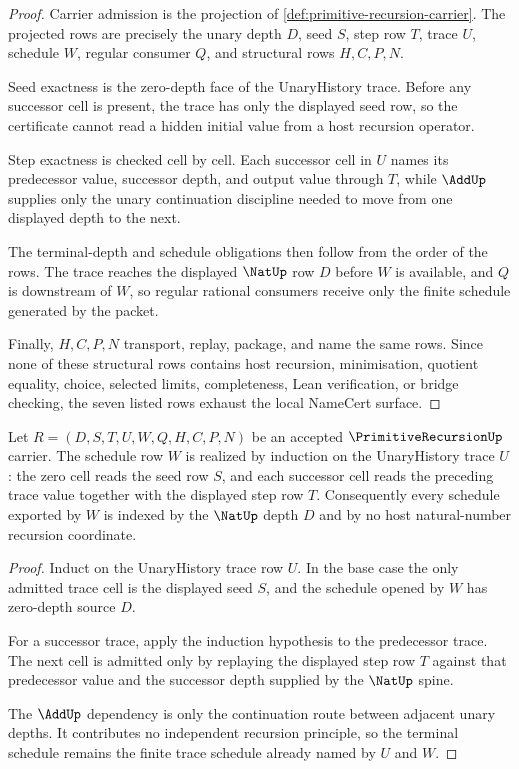 \begin{proof}
Carrier admission is the projection of \autoref{def:primitive-recursion-carrier}. The projected rows are precisely the unary depth $D$, seed $S$, step row $T$, trace $U$, schedule $W$, regular consumer $Q$, and structural rows $H,C,P,N$.

Seed exactness is the zero-depth face of the UnaryHistory trace. Before any successor cell is present, the trace has only the displayed seed row, so the certificate cannot read a hidden initial value from a host recursion operator.

Step exactness is checked cell by cell. Each successor cell in $U$ names its predecessor value, successor depth, and output value through $T$, while $\AddUp$ supplies only the unary continuation discipline needed to move from one displayed depth to the next.

The terminal-depth and schedule obligations then follow from the order of the rows. The trace reaches the displayed $\NatUp$ row $D$ before $W$ is available, and $Q$ is downstream of $W$, so regular rational consumers receive only the finite schedule generated by the packet.

Finally, $H,C,P,N$ transport, replay, package, and name the same rows. Since none of these structural rows contains host recursion, minimisation, quotient equality, choice, selected limits, completeness, Lean verification, or bridge checking, the seven listed rows exhaust the local NameCert surface.
\end{proof}

\begin{theorem}
\label{thm:primitive-recursion-unary-schedule-realization}
Let $R=(D,S,T,U,W,Q,H,C,P,N)$ be an accepted $\PrimitiveRecursionUp$ carrier. The schedule row $W$ is realized by induction on the UnaryHistory trace $U$: the zero cell reads the seed row $S$, and each successor cell reads the preceding trace value together with the displayed step row $T$. Consequently every schedule exported by $W$ is indexed by the $\NatUp$ depth $D$ and by no host natural-number recursion coordinate.
\end{theorem}
\begin{proof}
Induct on the UnaryHistory trace row $U$. In the base case the only admitted trace cell is the displayed seed $S$, and the schedule opened by $W$ has zero-depth source $D$.

For a successor trace, apply the induction hypothesis to the predecessor trace. The next cell is admitted only by replaying the displayed step row $T$ against that predecessor value and the successor depth supplied by the $\NatUp$ spine.

The $\AddUp$ dependency is only the continuation route between adjacent unary depths. It contributes no independent recursion principle, so the terminal schedule remains the finite trace schedule already named by $U$ and $W$.
\end{proof}

